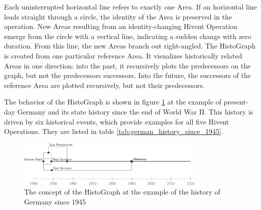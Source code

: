 \vspace{-2em}

Each uninterrupted horizontal line refers to exactly one Area. If an horizontal line leads straight through a circle, the identity of the Area is preserved in the operation. New Areas resulting from an identity-changing Hivent Operation emerge from the circle with a vertical line, indicating a sudden change with zero duration. From this line, the new Areas branch out right-angled. The HistoGraph is created from one particular reference Area. It visualizes historically related Areas in one direction: into the past, it recursively plots the predecessors on the graph, but not the predecessors successors. Into the future, the successors of the reference Area are plotted recursively, but not their predecessors.

The behavior of the HistoGraph is shown in figure \ref{fig:example_germany} at the example of present-day Germany and its state history since the end of World War II. This history is driven by six historical events, which provide examples for all five Hivent Operations. They are listed in table \ref{tab:german_history_since_1945}.

\begin{figure}[ht]
  \vspace{0.5em}
  \centering
  \includegraphics[width=0.8\textwidth]{graphics/development/hivent_model/histograph/example_germany}
  \caption{The concept of the HistoGraph at the example of the history of Germany since 1945}
  \label{fig:example_germany}
\end{figure}


